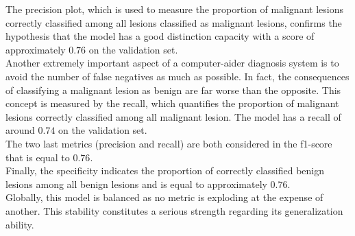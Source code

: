 The precision plot, which is used to measure the proportion of malignant lesions correctly classified among all lesions classified as malignant lesions, confirms the hypothesis that the model has a good distinction capacity with a score of approximately $0.76$ on the validation set.\\
Another extremely important aspect of a computer-aider diagnosis system is to avoid the number of false negatives as much as possible. In fact, the consequences of classifying a malignant lesion as benign are far worse than the opposite. This concept is measured by the recall, which quantifies the proportion of malignant lesions correctly classified among all malignant lesion. The model has a recall of around $0.74$ on the validation set.\\
The two last metrics (precision and recall) are both considered in the f1-score that is equal to $0.76$. \\
Finally, the specificity indicates the proportion of correctly classified benign lesions among all benign lesions and is equal to approximately $0.76$.\\
Globally, this model is balanced as no metric is exploding at the expense of another. This stability constitutes a serious strength regarding its generalization ability.

